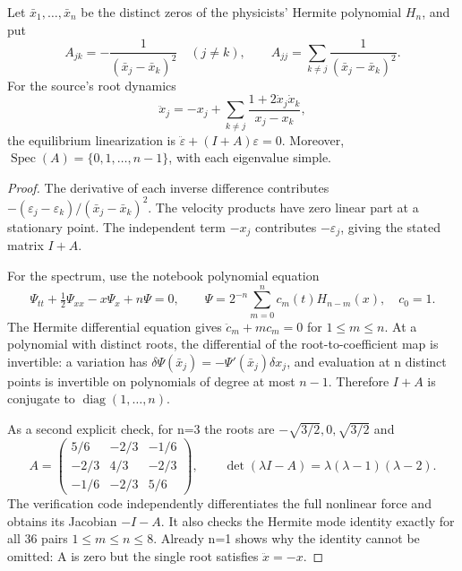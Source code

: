 \begin{proposition}\oursComputed
Let \(\bar x_1,\ldots,\bar x_n\) be the distinct zeros of the
physicists' Hermite polynomial \(H_n\), and put
\[
 A_{jk}=-\frac1{(\bar x_j-\bar x_k)^2}\quad(j\ne k),\qquad
 A_{jj}=\sum_{k\ne j}\frac1{(\bar x_j-\bar x_k)^2}.
\]
For the source's root dynamics
\[
 \ddot x_j=-x_j+\sum_{k\ne j}
       \frac{1+2\dot x_j\dot x_k}{x_j-x_k},
\]
the equilibrium linearization is
\(\ddot\varepsilon+(I+A)\varepsilon=0\).
Moreover, \(\operatorname{Spec}(A)=\{0,1,\ldots,n-1\}\), with
each eigenvalue simple.
\end{proposition}
\begin{proof}
The derivative of each inverse difference contributes
\(-(\varepsilon_j-\varepsilon_k)/(\bar x_j-\bar x_k)^2\).
The velocity products have zero linear part at a stationary point.
The independent term \(-x_j\) contributes \(-\varepsilon_j\),
giving the stated matrix \(I+A\).

For the spectrum, use the notebook polynomial equation
\[
 \Psi_{tt}+\tfrac12\Psi_{xx}-x\Psi_x+n\Psi=0,
 \qquad
 \Psi=2^{-n}\sum_{m=0}^n c_m(t)H_{n-m}(x),\quad c_0=1.
\]
The Hermite differential equation gives
\(\ddot c_m+mc_m=0\) for \(1\le m\le n\).
At a polynomial with distinct roots, the differential of the
root-to-coefficient map is invertible: a variation has
\(\delta\Psi(\bar x_j)=-\Psi'(\bar x_j)\delta x_j\), and
evaluation at n distinct points is invertible on polynomials of
degree at most \(n-1\). Therefore \(I+A\) is conjugate to
\(\operatorname{diag}(1,\ldots,n)\).

As a second explicit check, for n=3 the roots are
\(-\sqrt{3/2},0,\sqrt{3/2}\) and
\[
 A=\begin{pmatrix}
 5/6&-2/3&-1/6\\
 -2/3&4/3&-2/3\\
 -1/6&-2/3&5/6
 \end{pmatrix},\qquad
 \det(\lambda I-A)=\lambda(\lambda-1)(\lambda-2).
\]
The verification code independently differentiates the full nonlinear
force and obtains its Jacobian \(-I-A\). It also checks the Hermite
mode identity exactly for all 36 pairs \(1\le m\le n\le8\).
Already n=1 shows why the identity cannot be omitted: A is zero but
the single root satisfies \(\ddot x=-x\).
\end{proof}

